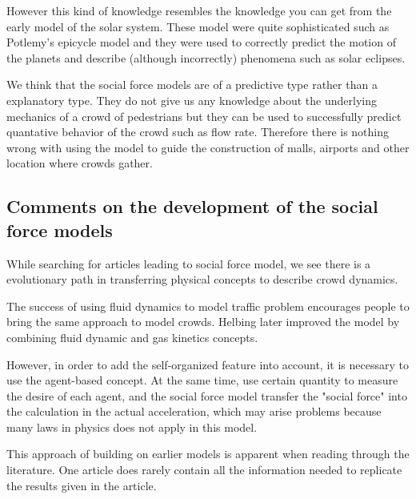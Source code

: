 However this kind of knowledge resembles the knowledge you can get from 
the early model of the solar system. These model were quite sophisticated 
such as Potlemy's epicycle model and they were used to correctly predict the 
motion of the planets and describe (although incorrectly) phenomena such as 
solar eclipses.

We think that the social force models are of a predictive type rather than 
a explanatory type. They do not give us any knowledge about the underlying 
mechanics of a crowd of pedestrians but they can be used to successfully 
predict quantative behavior of the crowd such as  flow rate. Therefore there 
is nothing wrong with using the model to guide the construction of malls, airports 
and other location where crowds gather.

\subsection{Comments on the development of the social force models}
\label{subsec:development}
While searching for articles leading to social force model, we see there is a 
evolutionary path in transferring physical concepts to describe crowd dynamics.

The success of using fluid dynamics to model traffic problem encourages 
people to bring the same approach to model crowds. Helbing later improved the  
model by combining fluid dynamic and gas kinetics concepts\cite{social-force}. 

However, in order to add the self-organized feature into account, it is necessary 
to use the agent-based concept.  At the same time, use certain quantity to measure
the desire of each agent, and the social force model transfer the "social force" into 
the calculation in the actual acceleration, which may arise problems because many laws 
in physics does not apply in this model. 

This approach of building on earlier models is apparent when reading through the 
literature. One article does rarely contain all the information needed to replicate 
the results given in the article.
